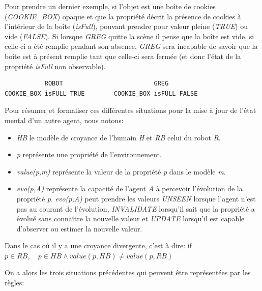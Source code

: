 \documentclass[a4paper,11pt,twoside]{StyleThese}
\begin{document}
\begin{itemize}
Pour prendre un dernier exemple, si l'objet est une boîte de cookies (\textit{COOKIE\_BOX}) opaque et que la propriété décrit la présence de cookies à l'intérieur de la boîte (\textit{isFull}), pouvant prendre pour valeur pleine (\textit{TRUE}) ou vide (\textit{FALSE}). Si lorsque \textit{GREG} quitte la scène il pense que la boîte est vide, si celle-ci a été remplie pendant son absence, \textit{GREG} sera incapable de savoir que la boîte est à présent remplie tant que celle-ci sera fermée (et donc l'état de la propriété \textit{isFull} non observable).

\begin{scriptsize}
\begin{verbatim}
           ROBOT                         GREG
COOKIE_BOX isFULL TRUE        COOKIE_BOX isFULL FALSE
\end{verbatim}
\end{scriptsize}
\end{itemize}

Pour résumer et formaliser ces différentes situations pour la mise à jour de l'état mental d'un autre agent, nous notons:

\begin{itemize}
\item \textit{HB} le modèle de croyance de l'humain \textit{H} et \textit{RB} celui du robot \textit{R}.
\item \textit{p} représente une propriété de l'environnement.
\item \textit{value(p,m)} représente la valeur de la propriété \textit{p} dans le modèle \textit{m}.
\item \textit{evo(p,A)} représente la capacité de l'agent \textit{A} à percevoir l'évolution de la propriété \textit{p}. \textit{evo(p,A)} peut prendre les valeurs \textit{UNSEEN} lorsque l'agent n'est pas au courant de l'évolution, \textit{INVALIDATE} lorsqu'il sait que la propriété a évolué sans connaître la nouvelle valeur et \textit{UPDATE} lorsqu'il est capable d'observer ou estimer la nouvelle valeur.
\end{itemize}

Dans le cas où il y a une croyance divergente, c'est à dire: \newline
if $p\in RB,\quad p\in HB \land value(p,HB)\neq value(p,RB)$

On a alors les trois situations précédentes qui peuvent être représentées par les règles:
\end{document}
